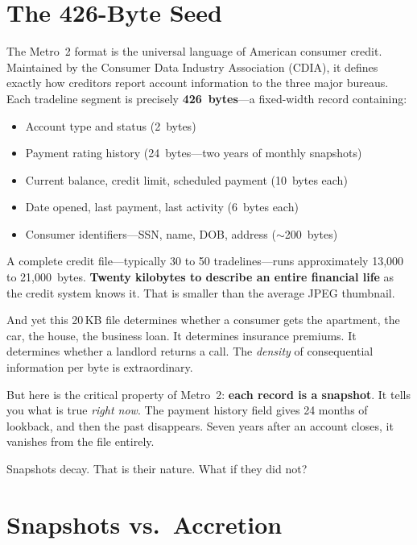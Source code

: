 \documentclass[11pt,twocolumn]{article}
\begin{document}
\section{The 426-Byte Seed}

The Metro~2 format is the universal language of American consumer credit. Maintained by the Consumer Data Industry Association (CDIA), it defines exactly how creditors report account information to the three major bureaus. Each tradeline segment is precisely \textbf{426~bytes}---a fixed-width record containing:

\begin{itemize}[nosep,leftmargin=1.2em]
  \item Account type and status (2~bytes)
  \item Payment rating history (24~bytes---two years of monthly snapshots)
  \item Current balance, credit limit, scheduled payment (10~bytes each)
  \item Date opened, last payment, last activity (6~bytes each)
  \item Consumer identifiers---SSN, name, DOB, address ($\sim$200~bytes)
\end{itemize}

A complete credit file---typically 30 to 50 tradelines---runs approximately 13,000 to 21,000~bytes. \textbf{Twenty kilobytes to describe an entire financial life} as the credit system knows it. That is smaller than the average JPEG thumbnail.

And yet this 20\,KB file determines whether a consumer gets the apartment, the car, the house, the business loan. It determines insurance premiums. It determines whether a landlord returns a call. The \emph{density} of consequential information per byte is extraordinary.

But here is the critical property of Metro~2: \textbf{each record is a snapshot}. It tells you what is true \emph{right now}. The payment history field gives 24 months of lookback, and then the past disappears. Seven years after an account closes, it vanishes from the file entirely.

Snapshots decay. That is their nature. What if they did not?

\section{Snapshots vs.\ Accretion}
\end{document}
